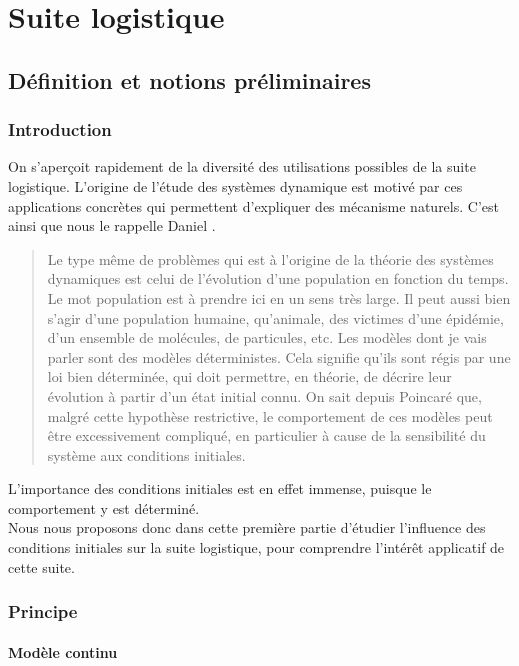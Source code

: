 %
%

\chapter{Suite logistique}
\section{Définition et notions préliminaires}
\subsection{Introduction}
On s'aperçoit rapidement de la diversité des utilisations possibles
de la suite logistique. L'origine de l'étude des systèmes dynamique est 
motivé par ces applications concrètes qui permettent d'expliquer des
mécanisme naturels. C'est ainsi que nous le rappelle Daniel \cite{Perrin}.
\begin{quotation}
Le type même de problèmes qui est à l'origine de la théorie des systèmes
dynamiques est celui de l'évolution d'une population en fonction du temps.
Le mot population est à prendre ici en un sens très large. Il peut aussi bien
s'agir d'une population humaine, qu'animale, des victimes d'une épidémie,
d'un ensemble de molécules, de particules, etc. Les modèles dont je vais parler
sont des modèles déterministes. Cela signifie qu'ils sont régis par une loi
bien déterminée, qui doit permettre, en théorie, de décrire leur évolution à
partir d'un état initial connu. On sait depuis Poincaré que, malgré cette 
hypothèse restrictive, le comportement de ces modèles peut être excessivement
compliqué, en particulier à cause de la sensibilité du système aux conditions
initiales.
\end{quotation}
L'importance des conditions initiales est en effet immense, puisque le
comportement y est déterminé.\\
Nous nous proposons donc dans cette première partie d'étudier l'influence
des conditions initiales sur la suite logistique, pour comprendre l'intérêt
applicatif de cette suite.

\subsection{Principe}
\subsubsection{Modèle continu}

